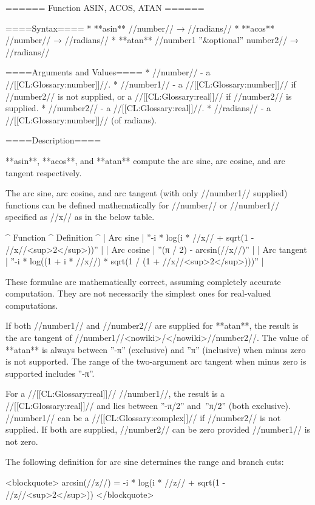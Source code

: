 ====== Function ASIN, ACOS, ATAN ======

====Syntax====
  * **asin** //number// → //radians// 
  * **acos** //number// → //radians// 
  * **atan** //number1 ''&optional'' number2// → //radians//

====Arguments and Values====
  * //number// - a //[[CL:Glossary:number]]//.
  * //number1// - a //[[CL:Glossary:number]]// if //number2// is not supplied, or a //[[CL:Glossary:real]]// if //number2// is supplied.
  * //number2// - a //[[CL:Glossary:real]]//.
  * //radians// - a //[[CL:Glossary:number]]// (of radians).

====Description====

**asin**, **acos**, and **atan** compute the arc sine, arc cosine, and arc tangent respectively.

The arc sine, arc cosine, and arc tangent (with only //number1// supplied) functions can be defined mathematically for //number// or //number1// specified as //x// as in the below table.

^ Function    ^ Definition                                           ^
| Arc sine    | ''-i * log(i * //x// + sqrt(1 - //x//<sup>2</sup>))''             |
| Arc cosine  | ''(π / 2) - arcsin(//x//)''                                       |
| Arc tangent | ''-i * log((1 + i * //x//) * sqrt(1 / (1 + //x//<sup>2</sup>)))'' |

These formulae are mathematically correct, assuming completely accurate computation. They are not necessarily the simplest ones for real-valued computations.

If both //number1// and //number2// are supplied for **atan**, the result is the arc tangent of //number1//<nowiki>/</nowiki>//number2//. The value of **atan** is always between ''-π'' (exclusive) and ''π'' (inclusive) when minus zero is not supported. The range of the two-argument arc tangent when minus zero is supported includes ''-π''.

For a //[[CL:Glossary:real]]// //number1//, the result is a //[[CL:Glossary:real]]// and lies between ''-π/2'' and~''π/2'' (both exclusive). //number1// can be a //[[CL:Glossary:complex]]// if //number2// is not supplied. If both are supplied, //number2// can be zero provided //number1// is not zero. 

The following definition for arc sine determines the range and branch cuts:

<blockquote>
arcsin(//z//) = -i * log(i * //z// + sqrt(1 - //z//<sup>2</sup>))
</blockquote>


